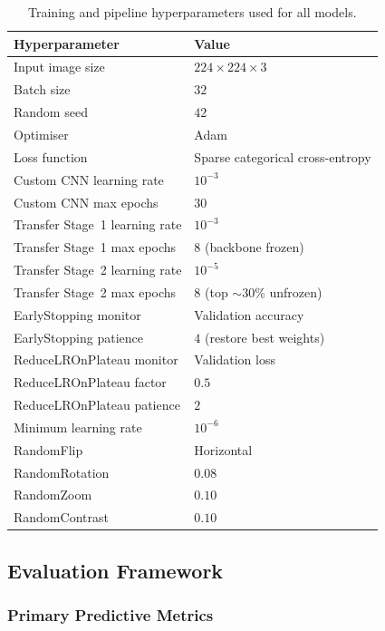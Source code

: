 \begin{table}[htbp]
\centering
\caption{Training and pipeline hyperparameters used for all models.}
\label{tab:hyper}
\begin{tabular}{ll}
\toprule
\textbf{Hyperparameter} & \textbf{Value} \\
\midrule
Input image size & $224\times224\times3$ \\
Batch size & $32$ \\
Random seed & $42$ \\
Optimiser & Adam \\
Loss function & Sparse categorical cross-entropy \\
Custom CNN learning rate & $10^{-3}$ \\
Custom CNN max epochs & $30$ \\
Transfer Stage~1 learning rate & $10^{-3}$ \\
Transfer Stage~1 max epochs & $8$ (backbone frozen) \\
Transfer Stage~2 learning rate & $10^{-5}$ \\
Transfer Stage~2 max epochs & $8$ (top ${\sim}30\%$ unfrozen) \\
EarlyStopping monitor & Validation accuracy \\
EarlyStopping patience & $4$ (restore best weights) \\
ReduceLROnPlateau monitor & Validation loss \\
ReduceLROnPlateau factor & $0.5$ \\
ReduceLROnPlateau patience & $2$ \\
Minimum learning rate & $10^{-6}$ \\
RandomFlip & Horizontal \\
RandomRotation & $0.08$ \\
RandomZoom & $0.10$ \\
RandomContrast & $0.10$ \\
\bottomrule
\end{tabular}
\end{table}

\subsection{Evaluation Framework}
\label{subsec:method-eval}

\subsubsection{Primary Predictive Metrics}
\label{subsubsec:method-primary}

